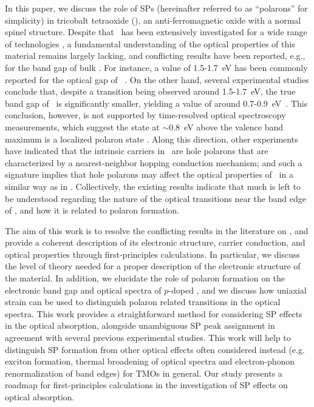 In this paper, we discuss the role of SPs (hereinafter referred to as ``polarons'' for simplicity) in tricobalt tetraoxide (\co), an anti-ferromagnetic oxide with a normal spinel structure. Despite that \co\ has been extensively investigated for a wide range of technologies \cite{wu2010,li2005,ma2014,wang2018,hamdani2010,aijaz2016,meher2011,xia2011}, a fundamental understanding of the optical properties of this material remains largely lacking, and conflicting results have been reported, e.g., for the band gap of bulk \co. For instance, a value of 1.5-1.7~eV has been commonly reported for the optical gap of \co~\cite{lohaus2016,jiang2014,waegele2014,shinde2006,belova1983,lima2014,cheng1998}. On the other hand, several experimental studies conclude that, despite a transition being observed around 1.5-1.7~eV, the true band gap of \co\ is significantly smaller, yielding a value of around 0.7-0.9~eV~\cite{qiao2013,singh2014,sousa2019,martens1985}. This conclusion, however, is not supported by time-resolved optical spectroscopy measurements, which suggest the state at $\sim$0.8~eV above the valence band maximum is a localized polaron state \cite{waegele2014,jiang2014,wheeler2012}. Along this direction, other experiments have indicated that the intrinsic carriers in \co\ are hole polarons that are characterized by a nearest-neighbor hopping conduction mechanism; and such a signature implies that hole polarons may affect the optical properties of \co\ in a similar way as in  \cite{ngamou2010,tronel2006,shinde2006,lohaus2016,sahoo2013,sparks2018,cheng1998,koumoto1981}. Collectively, the existing results indicate that much is left to be understood regarding the nature of the optical transitions near the band edge of \co, and how it is related to polaron formation.

The aim of this work is to resolve the conflicting results in the literature on \co, and provide a coherent description of its electronic structure, carrier conduction, and optical properties through first-principles calculations. In particular, we discuss the level of theory needed for a proper description of the electronic structure of the material. In addition, we elucidate the role of polaron formation on the electronic band gap and optical spectra of $p$-doped \co, and we discuss how uniaxial strain can be used to distinguish polaron related transitions in the optical spectra. This work provides a straightforward method for considering SP effects in the optical absorption, alongside unambiguous SP peak assignment in agreement with several previous experimental studies. This work will help to distinguish SP formation from other optical effects often considered instead (e.g. exciton formation, thermal broadening of optical spectra and electron-phonon renormalization of band edges) for TMOs in general. Our study presents a roadmap for first-principles calculations in the investigation of SP effects on optical absorption.

